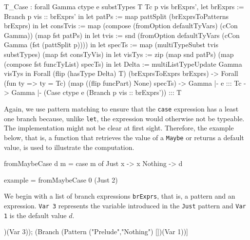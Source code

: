 \documentclass[paper = a4, fleqn, twoside]{scrreprt}
\begin{document}
\begin{coqcode}
T_Case : forall Gamma ctype e substTypes T Tc p vis brExprs',
           let  brExprs := Branch p vis :: brExprs' in
           let   patPs  := map pattSplit (brExprsToPatterns brExprs) in
           let consTvis := map (compose (fromOption defaultTyVars) (cCon Gamma))
                                (map fst patPs) in
           let     tvis := snd (fromOption defaultTyVars 
                                           (cCon Gamma (fst (pattSplit p)))) in
           let   specTs := map (multiTypeSubst tvis substTypes)
                               (map fst consTyVis) in
           let  visTys  := zip (map snd patPs)
                               (map (compose fst funcTyList) specTs) in
           let    Delta := multiListTypeUpdate Gamma visTys
            in Forall (flip (hasType Delta) T) (brExprsToExprs brExprs) ->
               Forall (fun ty => ty = Tc) (map ((flip funcPart) None) specTs) ->
               Gamma |- e ::: Tc ->
         Gamma |- (Case ctype e (Branch p vis :: brExprs')) ::: T
\end{coqcode}
Again, we use pattern matching to ensure that the \texttt{case} expression has a least one branch because, unlike \texttt{let}, the expression would otherwise not be typeable. The implementation might not be clear at first sight. Therefore, the example below, that is, a function that retrieves the value of a \texttt{Maybe} or returns a default value, is used to illustrate the computation.
\begin{flushleft}
	\begin{minipage}[t]{.45 \linewidth}
		\begin{coqcode}
fromMaybeCase d m = case m of
                      Just x  -> x
                      Nothing -> d
		\end{coqcode}
	\end{minipage}
	\hfill
	\vrule
	\vspace{.5em}
	\begin{minipage}[t]{.5 \linewidth}
		\begin{coqcode}
example = fromMaybeCase 0 (Just 2)
		\end{coqcode}
	\end{minipage}
\end{flushleft}
We begin with a list of branch expressions \texttt{brExprs}, that is, a pattern and an expression. \texttt{Var 3} represents the variable introduced in the \texttt{Just} pattern and \texttt{Var 1} is the default value $d$.
\begin{coqcode}
[(Branch (Pattern ("Prelude","Just")   [3])(Var 3));
 (Branch (Pattern ("Prelude","Nothing") [])(Var 1))]
\end{coqcode}
\end{document}
